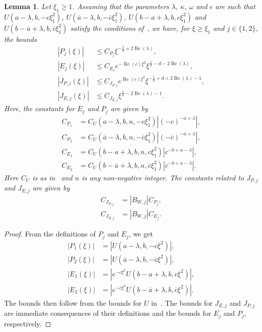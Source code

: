 \documentclass[11pt]{article}
\DeclareMathOperator{\real}{Re}
\newcommand{\conj}[1]{\overline{#1}}
\newtheorem{lemma}[definition]{Lemma}
\begin{document}
\begin{lemma}\label{lemma:P_i_E_i-bounds}
  Let \(\xi_{1} \geq 1\). Assuming that the parameters \(\lambda\),
  \(\kappa\), \(\omega\) and \(\epsilon\) are such that
  \(U(a - \lambda, b, -c\xi_{1}^{2})\),
  \(U(\conj{a} - \lambda, b, -\conj{c}\xi_{1}^{2})\),
  \(U(b - a + \lambda, b, c\xi_{1}^{2})\) and
  \(U(b - \conj{a} + \lambda, b, \conj{c}\xi_{1}^{2})\)
  satisfy the conditions of~\cite[Lemma~7.1]{Dahne2024}, we have, for
  \(\xi \geq \xi_{1}\) and \(j \in \{1, 2\}\), the bounds
  \begin{align*}
    \left|P_{j}(\xi)\right| &\leq C_{P_{j}}\xi^{-\frac{1}{\sigma} + 2\real(\lambda)},\\
    \left|E_{j}(\xi)\right| &\leq C_{E_{j}}e^{-\real(c)\xi^{2}}\xi^{\frac{1}{\sigma} - d - 2\real(\lambda)},\\
    \left|J_{P,j}(\xi)\right| &\leq C_{J_{P,j}}e^{\real(c)\xi^{2}}\xi^{-\frac{1}{\sigma} + d + 2\real(\lambda) - 1},\\
    \left|J_{E,j}(\xi)\right| &\leq C_{J_{E,j}}\xi^{\frac{1}{\sigma} - 2\real(\lambda) - 1}.
  \end{align*}
  Here, the constants for \(E_{j}\) and \(P_{j}\) are given by
  \begin{align*}
    C_{P_{1}} &= C_{U}(a - \lambda, b, n, -c\xi_{1}^{2})\left|(-c)^{-a + \lambda}\right|,\\
    C_{P_{2}} &= C_{U}(\conj{a} - \lambda, b, n, -\conj{c}\xi_{1}^{2})\left|(-\conj{c})^{-\conj{a} + \lambda}\right|,\\
    C_{E_{1}} &= C_{U}(b - a + \lambda, b, n, c\xi_{1}^{2})\left|c^{-b + a - \lambda}\right|,\\
    C_{E_{2}} &= C_{U}(b - \conj{a} + \lambda, b, n, \conj{c}\xi_{1}^{2})\left|\conj{c}^{-b + \conj{a} - \lambda}\right|.
  \end{align*}
  Here \(C_{U}\) is as in~\cite[Lemma~7.1]{Dahne2024} and \(n\) is any
  non-negative integer. The constants related to \(J_{P,j}\) and
  \(J_{E,j}\) are given by
  \begin{align*}
    C_{J_{P,j}} &= |B_{W,j}|C_{P_{j}},\\
    C_{J_{E,j}} &= |B_{W,j}|C_{E_{j}}.
  \end{align*}
\end{lemma}

\begin{proof}
  From the definitions of \(P_{j}\) and \(E_{j}\), we get
  \begin{align*}
    \left|P_{1}(\xi)\right| &= |U(a - \lambda, b, -c\xi^{2})|,\\
    \left|P_{2}(\xi)\right| &= |U(\conj{a} - \lambda, b, -\conj{c}\xi^{2})|,\\
    \left|E_{1}(\xi)\right| &= |e^{-c\xi^{2}}U(b - a + \lambda, b, c\xi^{2})|,\\
    \left|E_{2}(\xi)\right| &= |e^{-\conj{c}\xi^{2}}U(b - \conj{a} + \lambda, b, \conj{c}\xi^{2})|.
  \end{align*}
  The bounds then follow from the bounds for \(U\)
  in~\cite[Lemma~7.1]{Dahne2024}. The bounds for \(J_{E,j}\) and
  \(J_{P,j}\) are immediate consequences of their definitions and the
  bounds for \(E_{j}\) and \(P_{j}\), respectively.
\end{proof}
\end{document}
